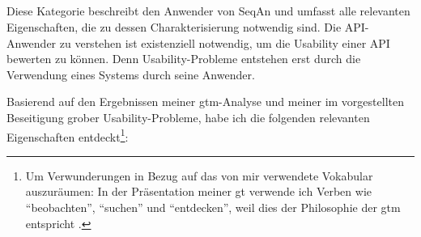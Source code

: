 \subsection[Anwender]{}

Diese Kategorie beschreibt den Anwender von SeqAn und umfasst alle relevanten Eigenschaften, die zu dessen Charakterisierung notwendig sind. Die API-Anwender zu verstehen ist existenziell notwendig, um die Usability einer API bewerten zu können. Denn Usability-Probleme entstehen erst durch die Verwendung eines Systems durch seine Anwender.

Basierend auf den Ergebnissen meiner \gls{gtm}-Analyse und meiner im  vorgestellten Beseitigung grober Usability-Probleme, habe ich die folgenden relevanten Eigenschaften entdeckt\footnote{Um Verwunderungen in Bezug auf das von mir verwendete Vokabular auszuräumen: In der Präsentation meiner \gls{gt} verwende ich Verben wie ``beobachten'', ``suchen'' und ``entdecken'', weil dies der Philosophie der \gls{gtm} entspricht \citep[siehe  und][]{Glaser:1967ts}.}:
